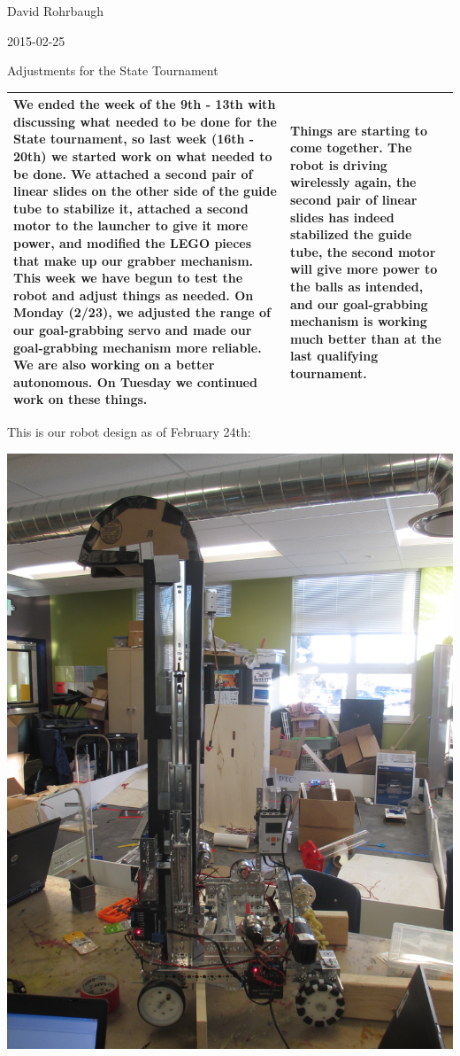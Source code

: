 David Rohrbaugh

2015-02-25

Adjustments for the State Tournament

\begin{tabular}{|p{5cm}|p{5cm}|}
 \hline
 We ended the week of the 9th - 13th with discussing what needed to be done for the State tournament, so last week (16th - 20th) we started work on what needed to be done. We attached a second pair of linear slides on the other side of the guide tube to stabilize it, attached a second motor to the launcher to give it more power, and modified the LEGO pieces that make up our grabber mechanism. This week we have begun to test the robot and adjust things as needed. On Monday (2/23), we adjusted the range of our goal-grabbing servo and made our goal-grabbing mechanism more reliable. We are also working on a better autonomous. On Tuesday we continued work on these things.
 &
 Things are starting to come together. The robot is driving wirelessly again, the second pair of linear slides has indeed stabilized the guide tube, the second motor will give more power to the balls as intended, and our goal-grabbing mechanism is working much better than at the last qualifying tournament.
 \\
 \hline
\end{tabular}

\pagebreak

This is our robot design as of February 24th:

\begin{center}
 \includegraphics[width=\textwidth,angle=90,origin=c]{./Entries/Images/robotFeb24.JPG}
\end{center}

